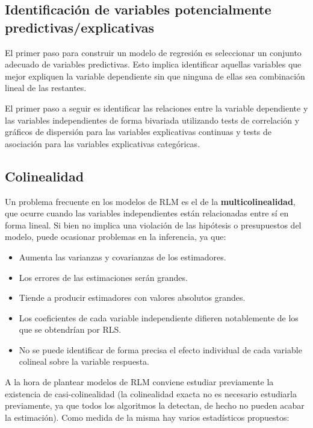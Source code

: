 \documentclass[
  spanish,
  a4paper,
]{scrbook}
\begin{document}
\subsection{Identificación de variables potencialmente
predictivas/explicativas}\label{identificaciuxf3n-de-variables-potencialmente-predictivasexplicativas}

El primer paso para construir un modelo de regresión es seleccionar un
conjunto adecuado de variables predictivas. Esto implica identificar
aquellas variables que mejor expliquen la variable dependiente sin que
ninguna de ellas sea combinación lineal de las restantes.

El primer paso a seguir es identificar las relaciones entre la variable
dependiente y las variables independientes de forma bivariada utilizando
tests de correlación y gráficos de dispersión para las variables
explicativas continuas y tests de asociación para las variables
explicativas categóricas.

\subsection{Colinealidad}\label{colinealidad}

Un problema frecuente en los modelos de RLM es el de la
\textbf{multicolinealidad}, que ocurre cuando las variables
independientes están relacionadas entre sí en forma lineal. Si bien no
implica una violación de las hipótesis o presupuestos del modelo, puede
ocasionar problemas en la inferencia, ya que:

\begin{itemize}
\item
  Aumenta las varianzas y covarianzas de los estimadores.
\item
  Los errores de las estimaciones serán grandes.
\item
  Tiende a producir estimadores con valores absolutos grandes.
\item
  Los coeficientes de cada variable independiente difieren notablemente
  de los que se obtendrían por RLS.
\item
  No se puede identificar de forma precisa el efecto individual de cada
  variable colineal sobre la variable respuesta.
\end{itemize}

A la hora de plantear modelos de RLM conviene estudiar previamente la
existencia de casi-colinealidad (la colinealidad exacta no es necesario
estudiarla previamente, ya que todos los algoritmos la detectan, de
hecho no pueden acabar la estimación). Como medida de la misma hay
varios estadísticos propuestos:
\end{document}

